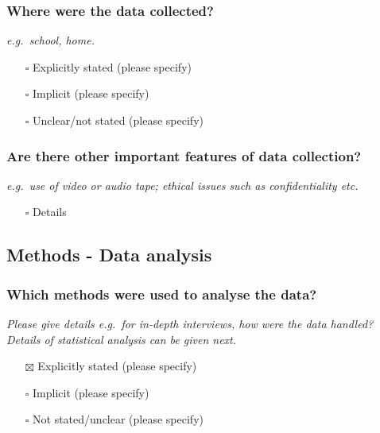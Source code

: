 \documentclass[
  doc, a4paper]{apa7}
\providecommand{\tightlist}{%
  \setlength{\itemsep}{0pt}\setlength{\parskip}{0pt}}
\begin{document}
\subsubsection{Where were the data collected?}\label{where-were-the-data-collected}

\emph{e.g.~school, home.}

\begin{itemize}
\tightlist
\item[$\square$]
  Explicitly stated (please specify)
\item[$\square$]
  Implicit (please specify)
\item[$\square$]
  Unclear/not stated (please specify)
\end{itemize}

\subsubsection{Are there other important features of data collection?}\label{are-there-other-important-features-of-data-collection}

\emph{e.g.~use of video or audio tape; ethical issues such as confidentiality etc.}

\begin{itemize}
\tightlist
\item[$\square$]
  Details
\end{itemize}

\subsection{Methods - Data analysis}\label{methods---data-analysis}

\subsubsection{Which methods were used to analyse the data?}\label{which-methods-were-used-to-analyse-the-data}

\emph{Please give details e.g.~for in-depth interviews, how were the data handled? Details of statistical analysis can be given next.}

\begin{itemize}
\tightlist
\item[$\boxtimes$]
  Explicitly stated (please specify)
\item[$\square$]
  Implicit (please specify)
\item[$\square$]
  Not stated/unclear (please specify)
\end{itemize}
\end{document}
